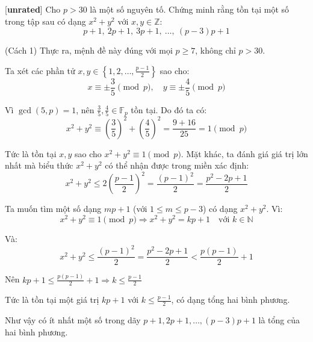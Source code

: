 \documentclass[../09-contruction-methods.tex]{subfiles}
\begin{document}
\begin{example*}\label{example:IRN-2015-N5}[\textbf{unrated}]
	Cho \( p > 30 \) là một số nguyên tố. Chứng minh rằng tồn tại một số trong tập sau có dạng \( x^2 + y^2 \) với \( x, y \in \mathbb{Z} \):
	\[
		p + 1,\ 2p + 1,\ 3p + 1,\ \dots,\ (p - 3)p + 1
	\]
\end{example*}

\begin{soln}(Cách 1)\footnotemark
	Thực ra, mệnh đề này đúng với mọi \( p \geq 7 \), không chỉ \( p > 30 \).

	Ta xét các phần tử \( x, y \in \left\{ 1, 2, \dots, \frac{p - 1}{2} \right\} \) sao cho:
	\[
		x \equiv \pm \frac{3}{5} \pmod{p}, \quad y \equiv \pm \frac{4}{5} \pmod{p}
	\]
	
	Vì \( \gcd(5, p) = 1 \), nên \( \frac{3}{5}, \frac{4}{5} \in \mathbb{F}_p \) tồn tại. Do đó ta có:
	\[
		x^2 + y^2 \equiv \left( \frac{3}{5} \right)^2 + \left( \frac{4}{5} \right)^2 = \frac{9 + 16}{25} = 1 \pmod{p}
	\]
	
	Tức là tồn tại \( x, y \) sao cho \( x^2 + y^2 \equiv 1 \pmod{p} \).
	Mặt khác, ta đánh giá giá trị lớn nhất mà biểu thức \( x^2 + y^2 \) có thể nhận được trong miền xác định:
	\[
		x^2 + y^2 \leq 2 \left( \frac{p - 1}{2} \right)^2 = \frac{(p - 1)^2}{2} = \frac{p^2 - 2p + 1}{2}
	\]
	
	Ta muốn tìm một số dạng \( mp + 1 \) (với \( 1 \leq m \leq p - 3 \)) có dạng \( x^2 + y^2 \). Vì:
	\[
		x^2 + y^2 \equiv 1 \pmod{p} \Rightarrow x^2 + y^2 = kp + 1 \quad \text{với } k \in \mathbb{N}
	\]
	
	Và:
	\[
		x^2 + y^2 \leq \frac{(p - 1)^2}{2} = \frac{p^2 - 2p + 1}{2} < \frac{p(p - 1)}{2} + 1
	\]
	
	Nên \( kp + 1 \leq \frac{p(p - 1)}{2} + 1 \Rightarrow k \leq \frac{p - 1}{2} \)
	
	Tức là tồn tại một giá trị \( kp + 1 \) với \( k \leq \frac{p - 1}{2} \), có dạng tổng hai bình phương.
	
	Như vậy có ít nhất một số trong dãy \( p + 1, 2p + 1, \dots, (p - 3)p + 1 \) là tổng của hai bình phương.
\end{soln}

\end{document}
